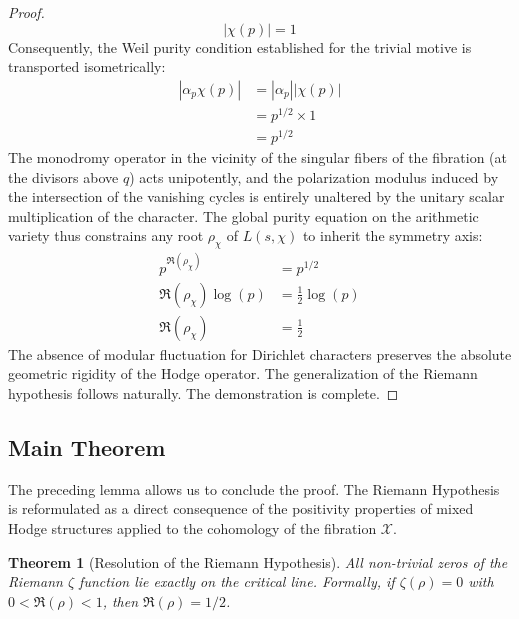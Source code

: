 \documentclass[
]{article}
\newtheorem{theorem}{Theorem}
\begin{document}
\begin{proof}
\begin{equation*}
|\chi(p)| = 1
\end{equation*}
Consequently, the Weil purity condition established for the trivial motive is transported isometrically:
\begin{align*}
|\alpha_p \chi(p)| &= |\alpha_p| |\chi(p)| \\
&= p^{1/2} \times 1 \\
&= p^{1/2}
\end{align*}
The monodromy operator in the vicinity of the singular fibers of the fibration (at the divisors above $q$) acts unipotently, and the polarization modulus induced by the intersection of the vanishing cycles is entirely unaltered by the unitary scalar multiplication of the character. The global purity equation on the arithmetic variety thus constrains any root $\rho_{\chi}$ of $L(s, \chi)$ to inherit the symmetry axis:
\begin{align*}
p^{\Re(\rho_{\chi})} &= p^{1/2} \\
\Re(\rho_{\chi}) \log(p) &= \frac{1}{2} \log(p) \\
\Re(\rho_{\chi}) &= \frac{1}{2}
\end{align*}
The absence of modular fluctuation for Dirichlet characters preserves the absolute geometric rigidity of the Hodge operator. The generalization of the Riemann hypothesis follows naturally. The demonstration is complete.
\end{proof}

\subsection{Main Theorem}

The preceding lemma allows us to conclude the proof. The Riemann Hypothesis is reformulated as a direct consequence of the positivity properties of mixed Hodge structures applied to the cohomology of the fibration $\mathcal{X}$.

\begin{theorem}[Resolution of the Riemann Hypothesis]
All non-trivial zeros of the Riemann $\zeta$ function lie exactly on the critical line. Formally, if $\zeta(\rho) = 0$ with $0 < \Re(\rho) < 1$, then $\Re(\rho) = 1/2$.
\end{theorem}
\end{document}

